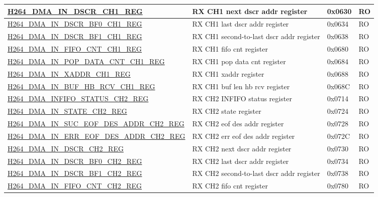 \begin{longtable}{ | p{7.5cm} | p{5.7cm} | p{1.2cm} | p{1.5cm} | }
\hyperref[regdesc:H264DMAINDSCRCH1REG]{H264\_DMA\_IN\_DSCR\_CH1\_REG} & RX CH1 next dscr addr register & 0x0630 & RO \\ \hline
\hyperref[regdesc:H264DMAINDSCRBF0CH1REG]{H264\_DMA\_IN\_DSCR\_BF0\_CH1\_REG} & RX CH1 last dscr addr register & 0x0634 & RO \\ \hline
\hyperref[regdesc:H264DMAINDSCRBF1CH1REG]{H264\_DMA\_IN\_DSCR\_BF1\_CH1\_REG} & RX CH1 second-to-last dscr addr register & 0x0638 & RO \\ \hline
\hyperref[regdesc:H264DMAINFIFOCNTCH1REG]{H264\_DMA\_IN\_FIFO\_CNT\_CH1\_REG} & RX CH1 fifo cnt register & 0x0680 & RO \\ \hline
\hyperref[regdesc:H264DMAINPOPDATACNTCH1REG]{H264\_DMA\_IN\_POP\_DATA\_CNT\_CH1\_REG} & RX CH1 pop data cnt register & 0x0684 & RO \\ \hline
\hyperref[regdesc:H264DMAINXADDRCH1REG]{H264\_DMA\_IN\_XADDR\_CH1\_REG} & RX CH1 xaddr register & 0x0688 & RO \\ \hline
\hyperref[regdesc:H264DMAINBUFHBRCVCH1REG]{H264\_DMA\_IN\_BUF\_HB\_RCV\_CH1\_REG} & RX CH1 buf len hb rcv register & 0x068C & RO \\ \hline
\hyperref[regdesc:H264DMAINFIFOSTATUSCH2REG]{H264\_DMA\_INFIFO\_STATUS\_CH2\_REG} & RX CH2 INFIFO status register & 0x0714 & RO \\ \hline
\hyperref[regdesc:H264DMAINSTATECH2REG]{H264\_DMA\_IN\_STATE\_CH2\_REG} & RX CH2 state register & 0x0724 & RO \\ \hline
\hyperref[regdesc:H264DMAINSUCEOFDESADDRCH2REG]{H264\_DMA\_IN\_SUC\_EOF\_DES\_ADDR\_CH2\_REG} & RX CH2 eof des addr register & 0x0728 & RO \\ \hline
\hyperref[regdesc:H264DMAINERREOFDESADDRCH2REG]{H264\_DMA\_IN\_ERR\_EOF\_DES\_ADDR\_CH2\_REG} & RX CH2 err eof des addr register & 0x072C & RO \\ \hline
\hyperref[regdesc:H264DMAINDSCRCH2REG]{H264\_DMA\_IN\_DSCR\_CH2\_REG} & RX CH2 next dscr addr register & 0x0730 & RO \\ \hline
\hyperref[regdesc:H264DMAINDSCRBF0CH2REG]{H264\_DMA\_IN\_DSCR\_BF0\_CH2\_REG} & RX CH2 last dscr addr register & 0x0734 & RO \\ \hline
\hyperref[regdesc:H264DMAINDSCRBF1CH2REG]{H264\_DMA\_IN\_DSCR\_BF1\_CH2\_REG} & RX CH2 second-to-last dscr addr register & 0x0738 & RO \\ \hline
\hyperref[regdesc:H264DMAINFIFOCNTCH2REG]{H264\_DMA\_IN\_FIFO\_CNT\_CH2\_REG} & RX CH2 fifo cnt register & 0x0780 & RO \\ \hline

\end{longtable}
